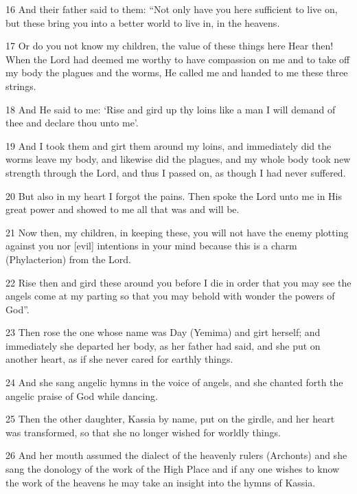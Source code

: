 \par 16 And their father said to them: “Not only have you here sufficient to live on, but these bring you into a better world to live in, in the heavens.

\par 17 Or do you not know my children, the value of these things here Hear then! When the Lord had deemed me worthy to have compassion on me and to take off my body the plagues and the worms, He called me and handed to me these three strings.

\par 18 And He said to me: ‘Rise and gird up thy loins like a man I will demand of thee and declare thou unto me'.

\par 19 And I took them and girt them around my loins, and immediately did the worms leave my body, and likewise did the plagues, and my whole body took new strength through the Lord, and thus I passed on, as though I had never suffered.

\par 20 But also in my heart I forgot the pains. Then spoke the Lord unto me in His great power and showed to me all that was and will be.

\par 21 Now then, my children, in keeping these, you will not have the enemy plotting against you nor [evil] intentions in your mind because this is a charm (Phylacterion) from the Lord.

\par 22 Rise then and gird these around you before I die in order that you may see the angels come at my parting so that you may behold with wonder the powers of God”.

\par 23 Then rose the one whose name was Day (Yemima) and girt herself; and immediately she departed her body, as her father had said, and she put on another heart, as if she never cared for earthly things.

\par 24 And she sang angelic hymns in the voice of angels, and she chanted forth the angelic praise of God while dancing.

\par 25 Then the other daughter, Kassia by name, put on the girdle, and her heart was transformed, so that she no longer wished for worldly things.

\par 26 And her mouth assumed the dialect of the heavenly rulers (Archonts) and she sang the donology of the work of the High Place and if any one wishes to know the work of the heavens he may take an insight into the hymns of Kassia.

